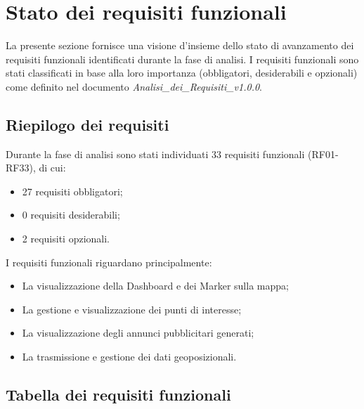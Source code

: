 \documentclass[10pt]{article}
\begin{document}
\newpage

\section{Stato dei requisiti funzionali}

La presente sezione fornisce una visione d'insieme dello stato di avanzamento dei requisiti funzionali identificati durante la fase di analisi. I requisiti funzionali sono stati classificati in base alla loro importanza (obbligatori, desiderabili e opzionali) come definito nel documento \textit{Analisi\_dei\_Requisiti\_v1.0.0}.

\subsection{Riepilogo dei requisiti}
Durante la fase di analisi sono stati individuati 33 requisiti funzionali (RF01-RF33), di cui:
\begin{itemize}
    \item 27 requisiti obbligatori;
    \item 0 requisiti desiderabili;
    \item 2 requisiti opzionali.
\end{itemize}

I requisiti funzionali riguardano principalmente:
\begin{itemize}
    \item La visualizzazione della Dashboard e dei Marker sulla mappa;
    \item La gestione e visualizzazione dei punti di interesse;
    \item La visualizzazione degli annunci pubblicitari generati;
    \item La trasmissione e gestione dei dati geoposizionali.
\end{itemize}

\subsection{Tabella dei requisiti funzionali}
\end{document}

